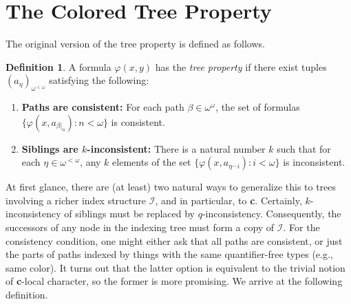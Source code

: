 \documentclass{article}
\newcommand{\calI}{\mathcal{I}}
\newcommand{\vphi}{\varphi}
\theoremstyle{definition}
\newtheorem{definition}{Definition}
\theoremstyle{definition}
\theoremstyle{definition}
\theoremstyle{definition}
\begin{document}
\section{The Colored Tree Property}

The original version of the tree property is defined as follows.

\begin{definition}\label{tree property}
    A formula $\vphi(x,y)$ has the \textit{tree property} if there exist  tuples $(a_\eta)_{\omega^{<\omega}}$ satisfying the following:

    \begin{enumerate}
        \item \textbf{Paths are consistent:}   For each path $\beta\in\omega^{\omega}$, the set of formulas $\{\vphi(x,a_{\beta|_n})\colon n<\omega\}$ is consistent.

        \item \textbf{Siblings are $k$-inconsistent:} There is a natural number $k$ such that for each $\eta\in\omega^{<\omega}$, any $k$ elements of the set $\{\vphi(x,a_{\eta^\smallfrown i})\colon i<\omega\}$ is inconsistent.
    \end{enumerate}
\end{definition}

At first glance, there are (at least) two natural ways to generalize this to trees involving a richer index structure $\calI$, and in particular, to \textbf{c}. Certainly, $k$-inconsistency of siblings must be replaced by $q$-inconsistency. Consequently, the successors of any node in the indexing tree must form a copy of $\calI$. For the consistency condition, one might either ask that all paths are consistent, or just the parts of paths indexed by things with the same quantifier-free types (e.g., same color). It turns out that the latter option is equivalent to the trivial notion of \textbf{c}-local character, so the former is more promising. We arrive at the following definition.
\end{document}
